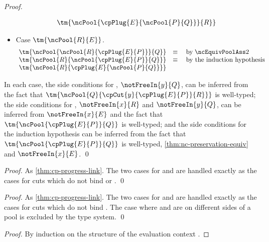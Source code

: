 \documentclass[UKenglish]{llncs}
\begin{document}
\begin{subappendices}
\begin{proof}
\begin{itemize}
\[\begin{array}{ll}
          \tm{\ncPool{\cpPlug{E}{\ncPool{P}{Q}}}{R}}
        \end{array}
      \]
    \item
      Case $\tm{\ncPool{R}{E}}$.
      \[\!
        \begin{array}{ll}
          \tm{\ncPool{\ncPool{R}{\cpPlug{E}{P}}}{Q}}
          & \equiv \quad \text{by} \; \ncEquivPoolAss2 \\
          \tm{\ncPool{R}{\ncPool{\cpPlug{E}{P}}{Q}}}
          & \equiv \quad \text{by the induction hypothesis} \\
          \tm{\ncPool{R}{\cpPlug{E}{\ncPool{P}{Q}}}}
        \end{array}
      \]
    \end{itemize}
    In each case, the side conditions for , $\notFreeIn{y}{Q}$,
    can be inferred from the fact that
    $\tm{\ncPool{Q}{\cpCut{y}{\cpPlug{E}{P}}{R}}}$ is well-typed; the side
    conditions for , $\notFreeIn{x}{R}$ and $\notFreeIn{y}{Q}$,
    can be inferred from $\notFreeIn{x}{E}$ and the fact that
    $\tm{\ncPool{\cpPlug{E}{P}}{Q}}$ is well-typed; and the side conditions for
    the induction hypothesis can be inferred from the fact that
    $\tm{\ncPool{\cpPlug{E}{P}}{Q}}$ is well-typed,
    \cref{thm:nc-preservation-equiv} and $\notFreeIn{x}{E}$.
    \qed
  \end{proof}
  \thmncprogresslink
  \begin{proof}
    As \cref{thm:cp-progress-link}. The two cases for
     and
     are handled exactly as the cases for cuts which
    do not bind  or . 
    \qed
  \end{proof}
  \thmncprogressbeta
  \begin{proof}
    As \cref{thm:cp-progress-link}. The two cases for
     and
    are handled exactly as the cases for cuts which do not bind . The case
    where  and  are on different sides of a pool is excluded by
    the type system.
    \qed
  \end{proof}
  \thmncprogressshared
  \begin{proof}
    By induction on the structure of the evaluation context .

\end{proof}
\end{subappendices}
\end{document}
